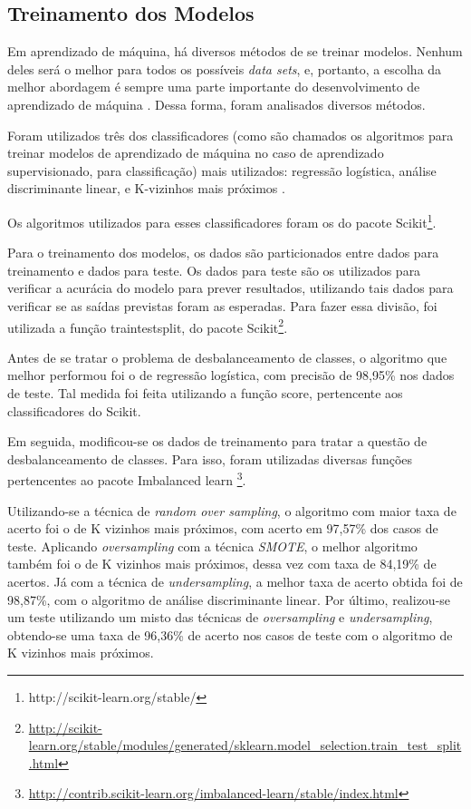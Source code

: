 		\subsection{Treinamento dos Modelos}

			Em aprendizado de máquina, há diversos métodos de se treinar modelos. Nenhum deles será o melhor para todos os possíveis \emph{data sets}, e, portanto, a escolha da melhor abordagem é sempre uma parte importante do desenvolvimento de aprendizado de máquina \cite{islr}. Dessa forma, foram analisados diversos métodos.

			Foram utilizados três dos classificadores (como são chamados os algoritmos para treinar modelos de aprendizado de máquina no caso de aprendizado supervisionado, para classificação) mais utilizados: regressão logística, análise discriminante linear, e K-vizinhos mais próximos \cite{islr}.

			Os algoritmos utilizados para esses classificadores foram os do pacote Scikit\footnote{http://scikit-learn.org/stable/}.

			Para o treinamento dos modelos, os dados são particionados entre dados para treinamento e dados para teste. Os dados para teste são os utilizados para verificar a acurácia do modelo para prever resultados, utilizando tais dados para verificar se as saídas previstas foram as esperadas. Para fazer essa divisão, foi utilizada a função train\textunderscore test\textunderscore split, do pacote Scikit\footnote{\url{http://scikit-learn.org/stable/modules/generated/sklearn.model_selection.train_test_split.html}}.

			Antes de se tratar o problema de desbalanceamento de classes, o algoritmo que melhor performou foi o de regressão logística, com precisão de 98,95\% nos dados de teste. Tal medida foi feita utilizando a função score, pertencente aos classificadores do Scikit.

			Em seguida, modificou-se os dados de treinamento para tratar a questão de desbalanceamento de classes. Para isso, foram utilizadas diversas funções pertencentes ao pacote Imbalanced learn \footnote{\url{http://contrib.scikit-learn.org/imbalanced-learn/stable/index.html}}.

			Utilizando-se a técnica de \emph{random over sampling}, o algoritmo com maior taxa de acerto foi o de K vizinhos mais próximos, com acerto em 97,57\% dos casos de teste. Aplicando \emph{oversampling} com a técnica \emph{SMOTE}, o melhor algoritmo também foi o de K vizinhos mais próximos, dessa vez com taxa de 84,19\% de acertos. Já com a técnica de \emph{undersampling}, a melhor taxa de acerto obtida foi de 98,87\%, com o algoritmo de análise discriminante linear. Por último, realizou-se um teste utilizando um misto das técnicas de \emph{oversampling} e \emph{undersampling}, obtendo-se uma taxa de 96,36\% de acerto nos casos de teste com o algoritmo de K vizinhos mais próximos.

